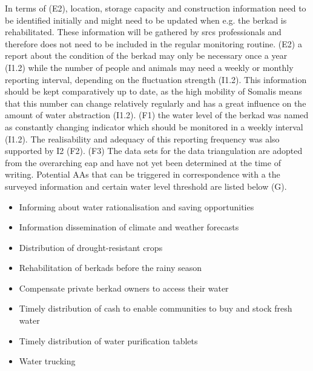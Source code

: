 In terms of (E2), location, storage capacity and construction information need to be identified initially and might need to be updated when e.g. the berkad is rehabilitated. These information will be gathered by \acrshort{srcs} professionals and therefore does not need to be included in the regular monitoring routine. (E2) a report about the condition of the berkad may only be necessary once a year (I1.2) while the number of people and animals may need a weekly or monthly reporting interval, depending on the fluctuation strength (I1.2). This information should be kept comparatively up to date, as the high mobility of Somalis means that this number can change relatively regularly and has a great influence on the amount of water abstraction (I1.2).\newline
(F1) the water level of the berkad was named as constantly changing indicator which should be monitored in a weekly interval (I1.2). The realisability and adequacy of this reporting frequency was also supported by I2 (F2). (F3) The data sets for the data triangulation are adopted from the overarching \acrshort{eap} and have not yet been determined at the time of writing.\newline 
Potential AAs that can be triggered in correspondence with a the surveyed information and certain water level threshold are listed below (G). 

\begin{itemize}
    \item Informing about water rationalisation and saving opportunities
    \item Information dissemination of climate and weather forecasts
    \item Distribution of drought-resistant crops
    \item Rehabilitation of berkads before the rainy season 
    \item Compensate private berkad owners to access their water
    \item Timely distribution of cash to enable communities to buy and stock fresh water
    \item Timely distribution of water purification tablets 
    \item Water trucking
\end{itemize}

